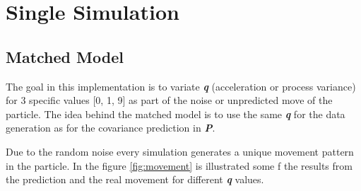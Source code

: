 \documentclass{article}
\begin{document}
        \section{Single Simulation}
            \subsection{Matched Model}

            The goal in this implementation is to variate \textbf{\textit{q}} (acceleration or process variance) for 3 specific values [0, 1, 9]
            as part of the noise or unpredicted move of the particle. The idea behind the matched model is to use the same \textbf{\textit{q}} for the
            data generation as for the covariance prediction in \textbf{\textit{P}}.

            Due to the random noise every simulation generates a unique movement pattern in the particle. In the figure \ref{fig:movement} is illustrated
            some f the results from the prediction and the real movement for different \textbf{\textit{q}} values.
                
\end{document}
